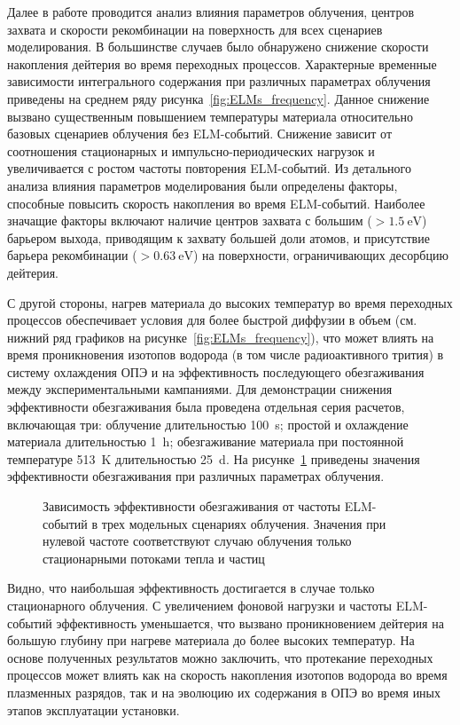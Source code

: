 Далее в работе проводится анализ влияния параметров облучения, центров захвата и скорости рекомбинации на поверхность для всех сценариев моделирования. В большинстве случаев было обнаружено снижение скорости накопления дейтерия во время переходных процессов. Характерные временные зависимости интегрального содержания при различных параметрах облучения приведены на среднем ряду рисунка~\cref{fig:ELMs_frequency}. Данное снижение вызвано существенным повышением температуры материала относительно базовых сценариев облучения без ELM-событий. Снижение зависит от соотношения стационарных и импульсно-периодических нагрузок и увеличивается с ростом частоты повторения ELM-событий. Из детального анализа влияния параметров моделирования были определены факторы, способные повысить скорость накопления во время ELM-событий. Наиболее значащие факторы включают наличие центров захвата с большим (\( >\SI{1.5}{\electronvolt} \)) барьером выхода, приводящим к захвату большей доли атомов, и присутствие барьера рекомбинации (\( >\SI{0.63}{\electronvolt} \)) на поверхности, ограничивающих десорбцию дейтерия.

С другой стороны, нагрев материала до высоких температур во время переходных процессов обеспечивает условия для более быстрой диффузии в объем (см. нижний ряд графиков на рисунке~\cref{fig:ELMs_frequency}), что может влиять на время проникновения изотопов водорода (в том числе радиоактивного трития) в систему охлаждения ОПЭ и на эффективность последующего обезгаживания между экспериментальными кампаниями. Для демонстрации снижения эффективности обезгаживания была проведена отдельная серия расчетов, включающая три: облучение длительностью \SI{100}{\second}; простой и охлаждение материала длительностью \SI{1}{\hour}; обезгаживание материала при постоянной температуре \SI{513}{\kelvin} длительностью \SI{25}{\day}. На рисунке~\cref{fig:baking_efficiency} приведены значения эффективности обезгаживания при различных параметрах облучения.

\begin{figure}[ht]
	\caption{Зависимость эффективности обезгаживания от частоты ELM-событий в трех модельных сценариях облучения. Значения при нулевой частоте соответствуют случаю облучения только стационарными потоками тепла и частиц}\label{fig:baking_efficiency}
\end{figure}
Видно, что наибольшая эффективность достигается в случае только стационарного облучения. С увеличением фоновой нагрузки и частоты ELM-событий эффективность уменьшается, что вызвано проникновением дейтерия на большую глубину при нагреве материала до более высоких температур. На основе полученных результатов можно заключить, что протекание переходных процессов может влиять как на скорость накопления изотопов водорода во время плазменных разрядов, так и на эволюцию их содержания в ОПЭ во время иных этапов эксплуатации установки.  

